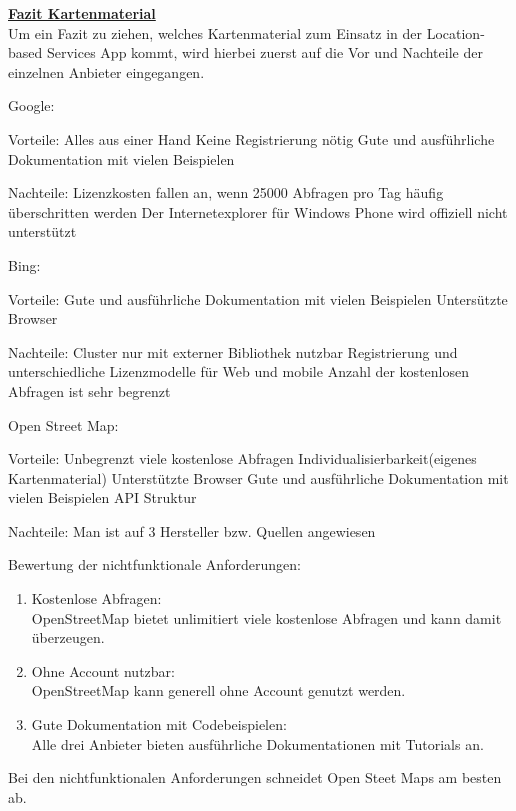 \textbf{\underline{Fazit Kartenmaterial}}\\
Um ein Fazit zu ziehen, welches Kartenmaterial zum Einsatz in der Location-based Services App kommt, wird hierbei zuerst auf die Vor und Nachteile der einzelnen Anbieter eingegangen.

Google:

Vorteile:
Alles aus einer Hand
Keine Registrierung nötig
Gute und ausführliche Dokumentation mit vielen Beispielen

Nachteile:
Lizenzkosten fallen an, wenn 25000 Abfragen pro Tag häufig überschritten werden
Der Internetexplorer für Windows Phone wird offiziell nicht unterstützt

Bing:

Vorteile:
Gute und ausführliche Dokumentation mit vielen Beispielen
Untersützte Browser

Nachteile:
Cluster nur mit externer Bibliothek nutzbar
Registrierung und unterschiedliche Lizenzmodelle für Web und mobile
Anzahl der kostenlosen Abfragen ist sehr begrenzt


Open Street Map:

Vorteile:
Unbegrenzt viele kostenlose Abfragen
Individualisierbarkeit(eigenes Kartenmaterial)
Unterstützte Browser
Gute und ausführliche Dokumentation mit vielen Beispielen
API Struktur

Nachteile:
Man ist auf 3 Hersteller bzw. Quellen angewiesen


Bewertung der nichtfunktionale Anforderungen:
\begin{enumerate}
\item Kostenlose Abfragen: \\
OpenStreetMap bietet unlimitiert viele kostenlose Abfragen und kann damit überzeugen.
\item Ohne Account nutzbar: \\
OpenStreetMap kann generell ohne Account genutzt werden.
\item Gute Dokumentation mit Codebeispielen:\\
Alle drei Anbieter bieten ausführliche Dokumentationen mit Tutorials an.
\end{enumerate}

Bei den nichtfunktionalen Anforderungen schneidet Open Steet Maps am besten ab. 

